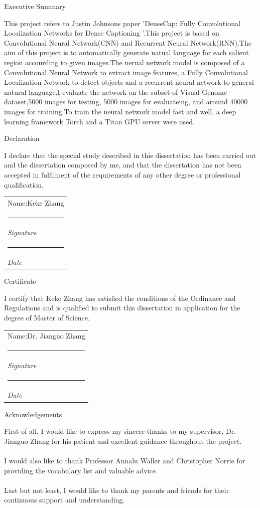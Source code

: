 \documentclass[12pt,a4paper]{report}
\makeatletter
\newcommand{\namesigdate}[2][5cm]{%
  \begin{tabular}{@{}p{#1}@{}}
    #2 \\[2\normalbaselineskip] \hrule \\[0pt]
    {\small \textit{Signature}} \\[2\normalbaselineskip] \hrule \\[0pt]
    {\small \textit{Date}}
  \end{tabular}
}
\makeatother
\begin{document}
\begin{center}
{\huge Executive Summary}
\end{center}
This project refers to Justin Johnson\textsc{}s paper 'DenseCap: Fully Convolutional Localization Networks for Dense Captioning '.This project is based on Convolutional Neural Network(CNN) and Recurrent Neural Network(RNN).The aim of this project is to automatically generate natual language for each salient region accourding to given images.The nerual network model is composed of a Convolutional Neural Network to extract image features, a Fully Convolutional Localization Network to detect objects and a recurrent neural network to general natural language.I evaluate the  network on the subset of Visual Genome dataset,5000 images for testing, 5000 images for evaluateing, and around 40000 images for training.To train the neural network model fast and well, a deep learning framework  Torch and a Titan GPU server were used.
\newpage

\begin{center}
{\huge Declaration}
\end{center}
I declare that the special study described in this dissertation has been carried out and the dissertation composed by me, and that the dissertation has not been accepted in fulfilment of the requirements of any other degree or professional qualification.\\

\vspace{3cm}

\noindent \namesigdate{Name:Keke Zhang}
\newpage


\begin{center}
{\huge Certificate}
\end{center}
I certify that Keke Zhang has satisfied the conditions of the Ordinance and Regulations and is qualified to submit this dissertation in application for the degree of Master of Science.


\vspace{3cm}

\noindent \namesigdate{Name:Dr. Jianguo Zhang}
\newpage

\newpage

\begin{center}
{\huge Acknowledgements}
\end{center}
First of all, I would like to express my sincere thanks to my supervisor, Dr. Jianguo Zhang for his patient and excellent guidance throughout the project.\\
\\
I would also like to thank Professor Annalu Waller and Christopher Norrie for providing the vocabulary list and valuable advice.\\
\\
Last but not least, I would like to thank my parents and friends for their continuous support and understanding.
\end{document}
